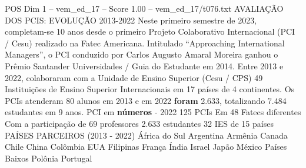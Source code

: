 \begin{textsample}{POS Dim 1 – vem\_ed\_17 – Score 1.00 – vem\_ed\_17/t076.txt}  \label{ex:f1_pos_138}
AVALIAÇÃO DOS PCIS: EVOLUÇÃO 2013-2022 Neste primeiro semestre de 2023, completam-se 10 anos desde o primeiro Projeto Colaborativo Internacional (PCI / Cesu) realizado na Fatec Americana.
Intitulado “Approaching International Managers”, o PCI conduzido por Carlos Augusto Amaral Moreira ganhou o Prêmio Santander Universidades / Guia do Estudante em 2014.
Entre 2013 e 2022, colaboraram com a Unidade de Ensino Superior (Cesu / CPS) 49 Instituições de Ensino Superior Internacionais em 17 países de 4 continentes.
Os PCIs atenderam 80 alunos em 2013 e em 2022 \textbf{foram} 2.633, totalizando 7.484 estudantes em 9 anos.
PCI em \textbf{números} - 2022 125 PCIs Em 48 Fatecs diferentes Com a participação de 69 professores 2.633 estudantes 32 IES de 15 países PAÍSES PARCEIROS (2013 - 2022) África do Sul Argentina Armênia Canada Chile China Colômbia EUA Filipinas França Índia Israel Japão México Países Baixos Polônia Portugal

\end{textsample}
